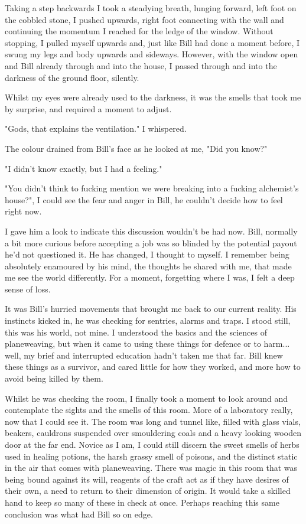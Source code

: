 Taking a step backwards I took a steadying breath, lunging forward, left foot on
the cobbled stone, I pushed upwards, right foot connecting with the wall and
continuing the momentum I reached for the ledge of the window. Without stopping,
I pulled myself upwards and, just like Bill had done a moment before, I swung my
legs and body upwards and sideways. However, with the window open and Bill
already through and into the house, I passed through and into the darkness of
the ground floor, silently.


Whilst my eyes were already used to the darkness, it was the smells that
took me by surprise, and required a moment to adjust.  

\begin{dialogue}
    \item{"Gods, that explains the ventilation." I whispered.}
    \item{The colour drained from Bill's face as he looked at me, "Did you know?"}
    \item{"I didn't know exactly, but I had a feeling."}
    \item{"You didn't think to fucking mention we were breaking into a fucking alchemist's house?", I could see the fear and anger in Bill, he couldn't decide how to feel right now.}
\end{dialogue}

I gave him a look to indicate this discussion wouldn't be had now. Bill,
normally a bit more curious before accepting a job was so blinded by the
potential payout he'd not questioned it. He has changed, I thought to myself. I
remember being absolutely enamoured by his mind, the thoughts he shared with me,
that made me see the world differently. For a moment, forgetting where I was, I
felt a deep sense of loss. 

It was Bill's hurried movements that brought me back to our current reality.
His instincts kicked in, he was checking for sentries, alarms and traps. I stood
still, this was his world, not mine. I understood the basics and the sciences of
planeweaving, but when it came to using these things for defence or to harm...
well, my brief and interrupted education hadn't taken me that far. Bill knew
these things as a survivor, and cared little for how they worked, and more how
to avoid being killed by them.

Whilst he was checking the room, I finally took a moment to look around and
contemplate the sights and the smells of this room. More of a laboratory really,
now that I could see it. The room was long and tunnel like, filled with glass vials, beakers,
cauldrons suspended over smouldering coals and a heavy looking wooden door at
the far end. Novice as I am, I could still
discern the sweet smells of herbs used in healing potions, the harsh grassy
smell of poisons, and the distinct static in the air that comes with
planeweaving. There was magic in this room that was being bound against its
will, reagents of the craft act as if they have desires of their own, a need to
return to their dimension of origin. It would take a skilled hand to keep so
many of these in check at once. Perhaps reaching this same conclusion was what
had Bill so on edge.

